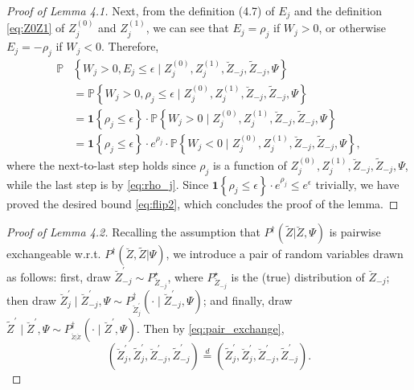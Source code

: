 ﻿\documentclass[12pt]{article}
\newcommand{\0}{\mbox{\bf 0}}
\theoremstyle{plain}%
\theoremstyle{definition}
\begin{document}
{\begin{proof}[Proof of Lemma 4.1]
Next, from the definition (4.7) of $E_{j}$ and the definition %
\eqref{eq:Z0Z1} of $Z_{j}^{(0)}$ and $Z_{j}^{(1)}$, we can see that $%
E_{j}=\rho _{j}$ if $W_{j}>0$, or otherwise $E_{j}=-\rho _{j}$ if $W_{j}<0$.
Therefore, 
\begin{align*}
\mathbb{P}& \left\{ W_{j}>0,E_{j}\leq \epsilon \mid Z_{j}^{(0)},Z_{j}^{(1)}, 
\breve{Z}_{-j},\widetilde{Z}_{-j},\Psi \right\} \\
& =\mathbb{P}\left\{ W_{j}>0,\rho _{j}\leq \epsilon \mid
Z_{j}^{(0)},Z_{j}^{(1)},\breve{Z}_{-j},\widetilde{Z}_{-j},\Psi \right\} \\
& =\boldsymbol{1}\left\{ \rho _{j}\leq \epsilon \right\} \cdot \mathbb{P}
\left\{ W_{j}>0\mid Z_{j}^{(0)},Z_{j}^{(1)},\breve{Z}_{-j},\widetilde{Z}
_{-j},\Psi \right\} \\
& =\boldsymbol{1}\left\{ \rho _{j}\leq \epsilon \right\} \cdot e^{\rho
_{j}}\cdot \mathbb{P}\left\{ W_{j}<0\mid Z_{j}^{(0)},Z_{j}^{(1)},\breve{Z}
_{-j},\widetilde{Z}_{-j},\Psi \right\} ,
\end{align*}
where the next-to-last step holds since $\rho _{j}$ is a function of $%
Z_{j}^{(0)},Z_{j}^{(1)},\breve{Z}_{-j},\widetilde{Z}_{-j},\Psi $, while the
last step is by \eqref{eq:rho_j}. Since $\boldsymbol{1}\left\{ \rho _{j}\leq
\epsilon \right\} \cdot e^{\rho _{j}}\leq e^{\epsilon }$ trivially, we have
proved the desired bound \eqref{eq:flip2}, which concludes the proof of the
lemma.
\end{proof}

\bigskip

\begin{proof}[Proof of Lemma  4.2]
Recalling the assumption that $P^{\dagger}\left(\widetilde{Z}|\breve{Z}
,\Psi \right) $ is pairwise exchangeable w.r.t. $P^{\dagger }\left( \breve{Z}
,\widetilde{Z}|\Psi \right) $, we introduce a pair of random variables drawn
as follows: first, draw $\breve{Z}_{-j}^{\prime }\sim P_{\breve{Z}
_{-j}}^{\star }$, where $P_{\breve{Z}_{-j}}^{\star }$ is the (true)
distribution of $\breve{Z}_{-j}$; then draw $\breve{Z}_{j}^{\prime }\mid 
\breve{Z}_{-j}^{\prime },\Psi \sim P_{\breve{Z}_{j}^{\prime }}^{\dagger
}\left( \cdot \mid \breve{Z}_{-j}^{\prime },\Psi \right) $; and finally,
draw $\widetilde{Z}^{\prime }\mid \breve{Z}^{\prime },\Psi \sim P_{_{ 
\widetilde{Z}|\breve{Z}}}^{\dagger }\left( \cdot \mid \breve{Z}^{\prime
},\Psi \right) $. Then by \eqref{eq:pair_exchange}, 
\begin{equation}  \label{eq:switchZ}
\left( \breve{Z}_{j}^{\prime },\widetilde{Z}_{j}^{\prime },\breve{Z}
_{-j}^{\prime },\widetilde{Z}_{-j}^{\prime }\right) \overset{d}{=}\left( 
\widetilde{Z}_{j}^{\prime },\breve{Z}_{j}^{\prime },\breve{Z}_{-j}^{\prime
}, \widetilde{Z}_{-j}^{\prime }\right).
\end{equation}


\end{proof}}
\end{document}

